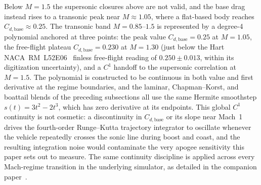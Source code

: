Below $M = 1.5$ the supersonic closures above are not valid, and the base drag
instead rises to a transonic peak near $M \approx 1.05$, where a flat-based body
reaches $C_{d,\text{base}} \approx 0.25$. The transonic band $M = 0.85$--$1.5$ is
represented by a degree-4 polynomial anchored at three points: the peak value
$C_{d,\text{base}} = 0.25$ at $M = 1.05$, the free-flight plateau
$C_{d,\text{base}} = 0.230$ at $M = 1.30$ (just below the Hart
NACA~RM~L52E06~\cite{hart1952basedrag} finless free-flight reading of
$0.250 \pm 0.013$, within its digitization uncertainty), and a $C^{1}$ handoff to
the supersonic correlation at $M = 1.5$.
The polynomial is constructed to be continuous in both value and first derivative
at the regime boundaries, and the laminar, Chapman--Korst, and boattail blends of
the preceding subsections all use the same Hermite smoothstep
$s(t) = 3t^{2} - 2t^{3}$, which has zero derivative at its endpoints. This global
$C^{1}$ continuity is not cosmetic: a discontinuity in $C_{d,\text{base}}$ or its
slope near Mach~1 drives the fourth-order Runge--Kutta trajectory integrator to
oscillate whenever the vehicle repeatedly crosses the sonic line during boost and
coast, and the resulting integration noise would contaminate the very apogee
sensitivity this paper sets out to measure. The same continuity discipline is
applied across every Mach-regime transition in the underlying simulator, as
detailed in the companion paper~\cite{yu2026jsr}.

